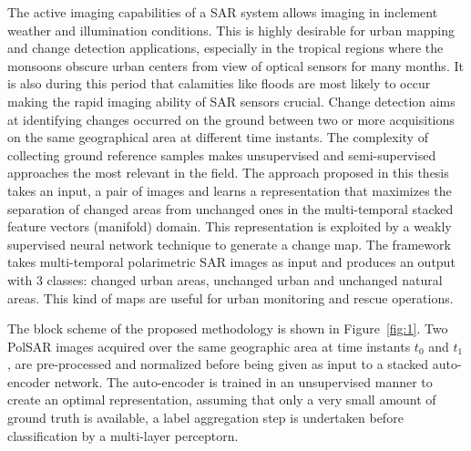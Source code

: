 \documentclass[12pt, a4paper]{article}
\begin{document}
The active imaging capabilities of a SAR system allows imaging in inclement weather and illumination conditions. This is highly desirable for urban mapping and change detection applications, especially in the tropical regions where the monsoons obscure urban centers from view of optical sensors for many months. It is also during this period that calamities like floods are most likely
to occur making the rapid imaging ability of SAR sensors crucial.
%
Change detection aims at identifying changes occurred on the ground between two or more acquisitions on the same geographical area at different time instants. The complexity of collecting ground reference samples makes unsupervised and semi-supervised approaches the most relevant in the field.
%
The approach proposed in this thesis takes an input, a pair of  images and learns a representation that maximizes the separation of changed areas from unchanged ones in the multi-temporal stacked feature vectors (manifold) domain. This representation is exploited by a weakly supervised neural network technique to generate a change map. The framework takes multi-temporal polarimetric SAR images as input and produces an output with 3 classes: changed urban areas, unchanged urban and unchanged natural areas. This kind of maps are useful for urban monitoring and rescue operations.

The block scheme of the proposed methodology is shown in Figure~\ref{fig:1}. Two PolSAR images acquired over the same geographic area at time instants $t_0$ and $t_1$ , are pre-processed and normalized before being given as input to a stacked auto-encoder network. The auto-encoder is trained in an unsupervised manner to create an optimal representation, assuming that only a very small amount of ground truth is available, a label aggregation step is undertaken before classification by a multi-layer perceptorn.
\end{document}
